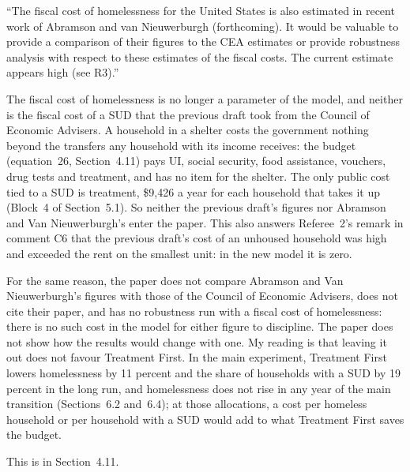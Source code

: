 \documentclass[11pt]{article}
\begin{document}
\begin{referee}
``The fiscal cost of homelessness for the United States is also estimated in
recent work of Abramson and van Nieuwerburgh (forthcoming). It would be valuable
to provide a comparison of their figures to the CEA estimates or provide
robustness analysis with respect to these estimates of the fiscal costs. The
current estimate appears high (see R3).''
\end{referee}
\begin{response}
The fiscal cost of homelessness is no longer a parameter of the model, and neither
is the fiscal cost of a SUD that the previous draft took from the Council of
Economic Advisers. A household in a shelter costs the government nothing beyond the
transfers any household with its income receives: the budget (equation~26,
Section~4.11) pays UI, social security, food assistance, vouchers, drug tests and
treatment, and has no item for the shelter. The only public cost tied to a SUD is
treatment, \$9,426 a year for each household that takes it up (Block~4 of
Section~5.1). So neither the previous draft's figures nor Abramson and Van
Nieuwerburgh's enter the paper. This also answers Referee~2's remark in comment C6
that the previous draft's cost of an unhoused household was high and exceeded the
rent on the smallest unit: in the new model it is zero.

\open For the same reason, the paper does not compare Abramson and Van
Nieuwerburgh's figures with those of the Council of Economic Advisers, does not
cite their paper, and has no robustness run with a fiscal cost of homelessness:
there is no such cost in the model for either figure to discipline. The paper does
not show how the results would change with one. My reading is that leaving it out
does not favour Treatment First. In the main experiment, Treatment First lowers
homelessness by 11 percent and the share of households with a SUD by 19 percent in
the long run, and homelessness does not rise in any year of the main transition
(Sections~6.2 and~6.4); at those allocations, a cost per homeless household or per
household with a SUD would add to what Treatment First saves the budget.

This is in Section~4.11.
\end{response}
\end{document}
